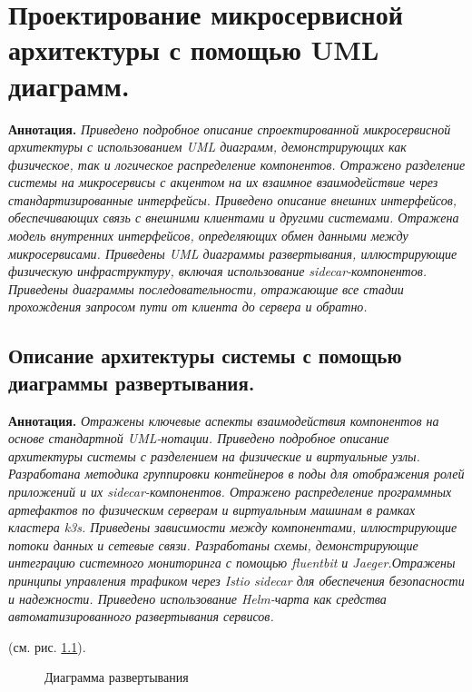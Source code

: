 \chapter{Проектирование микросервисной архитектуры с помощью UML диаграмм. }
\textbf{Аннотация.} \textit{Приведено подробное описание спроектированной микросервисной архитектуры с использованием UML диаграмм, демонстрирующих как физическое, так и логическое распределение компонентов. Отражено разделение системы на микросервисы с акцентом на их взаимное взаимодействие через стандартизированные интерфейсы. Приведено описание внешних интерфейсов, обеспечивающих связь с внешними клиентами и другими системами. Отражена модель внутренних интерфейсов, определяющих обмен данными между микросервисами. Приведены UML диаграммы развертывания, иллюстрирующие физическую инфраструктуру, включая использование sidecar-компонентов. Приведены диаграммы последовательности, отражающие все стадии прохождения запросом пути от клиента до сервера и обратно.}




\section{Описание архитектуры системы с помощью диаграммы развертывания.}
\textbf{Аннотация.} \textit{Отражены ключевые аспекты взаимодействия компонентов на основе стандартной UML-нотации. Приведено подробное описание архитектуры системы с разделением на физические и виртуальные узлы. Разработана методика группировки контейнеров в поды для отображения ролей приложений и их sidecar-компонентов. Отражено распределение программных артефактов по физическим серверам и виртуальным машинам в рамках кластера k3s. Приведены зависимости между компонентами, иллюстрирующие потоки данных и сетевые связи. Разработаны схемы, демонстрирующие интеграцию системного мониторинга с помощью fluentbit и Jaeger.Отражены принципы управления трафиком через Istio sidecar для обеспечения безопасности и надежности. Приведено использование Helm-чарта как средства автоматизированного развертывания сервисов. }

(см. рис. \ref{pic:deployment-diagram}).

\begin{figure}[t]
    \centering
    \caption{Диаграмма развертывания}
    \label{pic:deployment-diagram}
  \end{figure}
  

